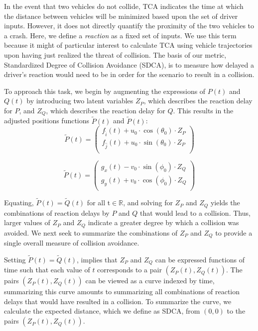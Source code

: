 \documentclass{article}
\begin{document}
In the event that two vehicles do not collide, TCA indicates the time at which the distance between vehicles will be minimized based upon the set of driver inputs. However, it does not directly quantify the proximity of the two vehicles to a crash. Here, we define a \textit{reaction} as a fixed set of inputs.  We use this term because it might of particular interest to calculate TCA using vehicle trajectories upon having just realized the threat of collision.  The basis of our metric, Standardized Degree of Collision Avoidance (SDCA), is to measure how delayed a driver's reaction would need to be in order for the scenario to result in a collision. 

To approach this task, we begin by augmenting the expressions of $P(t)$ and $Q(t)$ by introducing two latent variables $Z_P$, which describes the reaction delay for $P$, and $Z_Q$, which describes the reaction delay for $Q$. This results in the adjusted positions functions $\tilde{P}(t)$ and $\tilde{P}(t)$:
\begin{equation}
    \tilde{P}(t) =
  \left( {\begin{array}{c}
   f_{\hat{i}}(t) + u_0\cdot\cos(\theta_0)\cdot Z_P\\
   f_{\hat{j}}(t) + u_0\cdot\sin(\theta_0)\cdot Z_P \\
  \end{array} } \right)
  \label{pdot}
\end{equation}

\begin{equation}
   \tilde{P}(t) =
  \left( {\begin{array}{c}
   g_x(t) - v_0\cdot\sin(\phi_0)\cdot Z_Q\\
   g_y(t) + v_0\cdot\cos(\phi_0)\cdot Z_Q\\
  \end{array} } \right)
  \label{qdot}
\end{equation}

Equating, $\tilde{P}(t) = \tilde{Q}(t)$ for all t$\in\mathbb{R}$, and solving for $Z_P$ and $Z_Q$ yields the combinations of reaction delays by $P$ and $Q$ that would lead to a collision.  Thus, larger values of $Z_P$ and $Z_Q$ indicate a greater degree by which a collision was avoided.  We next seek to summarize the combinations of $Z_P$ and $Z_Q$ to provide a single overall measure of collision avoidance.

Setting $\tilde{P}(t) = \tilde{Q}(t)$, implies that $Z_P$ and $Z_Q$ can be expressed functions of time such that each value of $t$ corresponds to a pair $(Z_P(t), Z_Q(t) )$.  The pairs $(Z_P(t), Z_Q(t))$ can be viewed as a curve indexed by time, summarizing this curve amounts to summarizing all combinations of reaction delays that would have resulted in a collision. To summarize the curve, we calculate the expected distance, which we define as SDCA, from $(0,0)$ to the pairs $(Z_P(t), Z_Q(t))$. 
\end{document}
